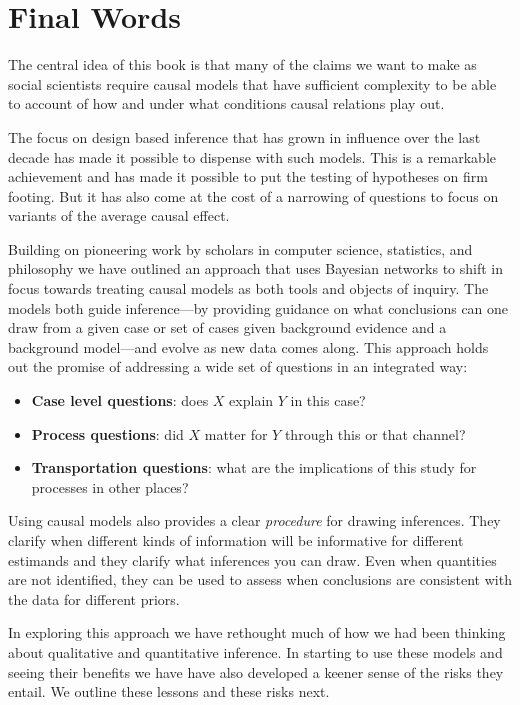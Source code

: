 \documentclass[
  12pt,
]{book}
\providecommand{\tightlist}{%
  \setlength{\itemsep}{0pt}\setlength{\parskip}{0pt}}
\begin{document}
\hypertarget{final-words}{%
\chapter{Final Words}\label{final-words}}

The central idea of this book is that many of the claims we want to make as social scientists require causal models that have sufficient complexity to be able to account of how and under what conditions causal relations play out.

The focus on design based inference that has grown in influence over the last decade has made it possible to dispense with such models. This is a remarkable achievement and has made it possible to put the testing of hypotheses on firm footing. But it has also come at the cost of a narrowing of questions to focus on variants of the average causal effect.

Building on pioneering work by scholars in computer science, statistics, and philosophy we have outlined an approach that uses Bayesian networks to shift in focus towards treating causal models as both tools and objects of inquiry. The models both guide inference---by providing guidance on what conclusions can one draw from a given case or set of cases given background evidence and a background model---and evolve as new data comes along. This approach holds out the promise of addressing a wide set of questions in an integrated way:

\begin{itemize}
\tightlist
\item
  \textbf{Case level questions}: does \(X\) explain \(Y\) in this case?
\item
  \textbf{Process questions}: did \(X\) matter for \(Y\) through this or that channel?
\item
  \textbf{Transportation questions}: what are the implications of this study for processes in other places?
\end{itemize}

Using causal models also provides a clear \emph{procedure} for drawing inferences. They clarify when different kinds of information will be informative for different estimands and they clarify what inferences you can draw. Even when quantities are not identified, they can be used to assess when conclusions are consistent with the data for different priors.

In exploring this approach we have rethought much of how we had been thinking about qualitative and quantitative inference. In starting to use these models and seeing their benefits we have have also developed a keener sense of the risks they entail. We outline these lessons and these risks next.
\end{document}
